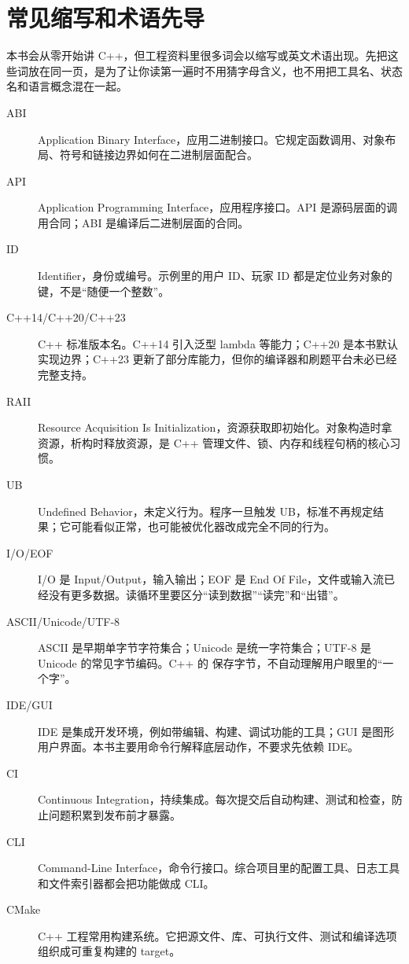 \chapter*{常见缩写和术语先导}

本书会从零开始讲 C++，但工程资料里很多词会以缩写或英文术语出现。先把这些词放在同一页，是为了让你读第一遍时不用猜字母含义，也不用把工具名、状态名和语言概念混在一起。

\begin{description}
  \item[ABI] Application Binary Interface，应用二进制接口。它规定函数调用、对象布局、符号和链接边界如何在二进制层面配合。
  \item[API] Application Programming Interface，应用程序接口。API 是源码层面的调用合同；ABI 是编译后二进制层面的合同。
  \item[ID] Identifier，身份或编号。示例里的用户 ID、玩家 ID 都是定位业务对象的键，不是“随便一个整数”。
  \item[C++14/C++20/C++23] C++ 标准版本名。C++14 引入泛型 lambda 等能力；C++20 是本书默认实现边界；C++23 更新了部分库能力，但你的编译器和刷题平台未必已经完整支持。
  \item[RAII] Resource Acquisition Is Initialization，资源获取即初始化。对象构造时拿资源，析构时释放资源，是 C++ 管理文件、锁、内存和线程句柄的核心习惯。
  \item[UB] Undefined Behavior，未定义行为。程序一旦触发 UB，标准不再规定结果；它可能看似正常，也可能被优化器改成完全不同的行为。
  \item[I/O/EOF] I/O 是 Input/Output，输入输出；EOF 是 End Of File，文件或输入流已经没有更多数据。读循环里要区分“读到数据”“读完”和“出错”。
  \item[ASCII/Unicode/UTF-8] ASCII 是早期单字节字符集合；Unicode 是统一字符集合；UTF-8 是 Unicode 的常见字节编码。C++ 的  保存字节，不自动理解用户眼里的“一个字”。
  \item[IDE/GUI] IDE 是集成开发环境，例如带编辑、构建、调试功能的工具；GUI 是图形用户界面。本书主要用命令行解释底层动作，不要求先依赖 IDE。
  \item[CI] Continuous Integration，持续集成。每次提交后自动构建、测试和检查，防止问题积累到发布前才暴露。
  \item[CLI] Command-Line Interface，命令行接口。综合项目里的配置工具、日志工具和文件索引器都会把功能做成 CLI。
  \item[CMake] C++ 工程常用构建系统。它把源文件、库、可执行文件、测试和编译选项组织成可重复构建的 target。

\end{description}
